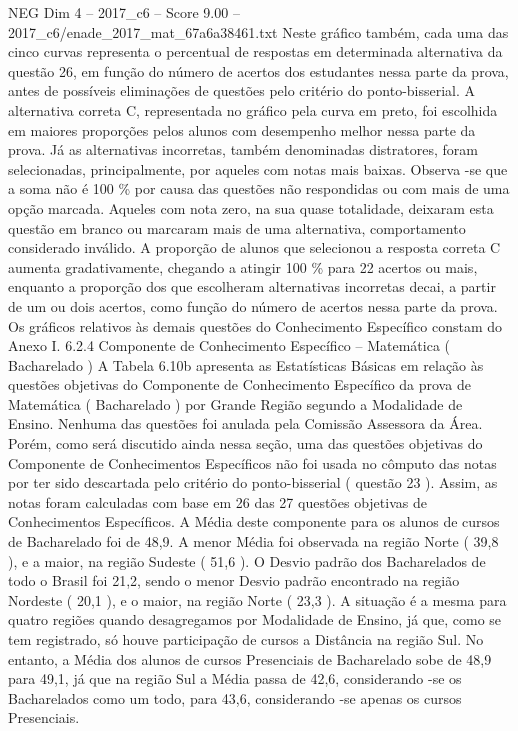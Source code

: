 \begin{textsample}{NEG Dim 4 – 2017\_c6 – Score 9.00 – 2017\_c6/enade\_2017\_mat\_67a6a38461.txt}
Neste gráfico também, cada uma das cinco curvas representa o percentual de respostas em determinada alternativa da questão 26, em função do número de acertos dos estudantes nessa parte da prova, antes de possíveis eliminações de questões pelo critério do ponto-bisserial.
A alternativa correta C, representada no gráfico pela curva em preto, foi escolhida em maiores proporções pelos alunos com desempenho melhor nessa parte da prova.
Já as alternativas incorretas, também denominadas distratores, foram selecionadas, principalmente, por aqueles com notas mais baixas.
Observa -se que a soma não é 100 \% por causa das questões não respondidas ou com mais de uma opção marcada.
Aqueles com nota zero, na sua quase totalidade, deixaram esta questão em branco ou marcaram mais de uma alternativa, comportamento considerado inválido.
A proporção de alunos que selecionou a resposta correta C aumenta gradativamente, chegando a atingir 100 \% para 22 acertos ou mais, enquanto a proporção dos que escolheram alternativas incorretas decai, a partir de um ou dois acertos, como função do número de acertos nessa parte da prova.
Os gráficos relativos às demais questões do Conhecimento Específico constam do Anexo I. 6.2.4 Componente de Conhecimento Específico – Matemática ( Bacharelado ) A Tabela 6.10b apresenta as Estatísticas Básicas em relação às questões objetivas do Componente de Conhecimento Específico da prova de Matemática ( Bacharelado ) por Grande Região segundo a Modalidade de Ensino.
Nenhuma das questões foi anulada pela Comissão Assessora da Área.
Porém, como será discutido ainda nessa seção, uma das questões objetivas do Componente de Conhecimentos Específicos não foi usada no cômputo das notas por ter sido descartada pelo critério do ponto-bisserial ( questão 23 ).
Assim, as notas foram calculadas com base em 26 das 27 questões objetivas de Conhecimentos Específicos.
A Média deste componente para os alunos de cursos de Bacharelado foi de 48,9.
A menor Média foi observada na região Norte ( 39,8 ), e a maior, na região Sudeste ( 51,6 ).
O Desvio padrão dos Bacharelados de todo o Brasil foi 21,2, sendo o menor Desvio padrão encontrado na região Nordeste ( 20,1 ), e o maior, na região Norte ( 23,3 ).
A situação é a mesma para quatro regiões quando desagregamos por Modalidade de Ensino, já que, como se tem registrado, só houve participação de cursos a Distância na região Sul.
No entanto, a Média dos alunos de cursos Presenciais de Bacharelado sobe de 48,9 para 49,1, já que na região Sul a Média passa de 42,6, considerando -se os Bacharelados como um todo, para 43,6, considerando -se apenas os cursos Presenciais.

\end{textsample}
